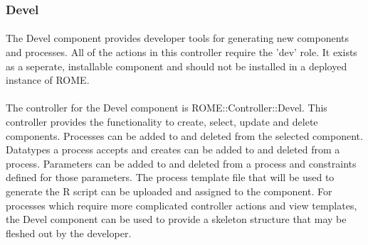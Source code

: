 \subsubsection{Devel}
\label{sec:devel}

\paragraph{}
The Devel component provides developer tools for generating new components and processes. All of the actions in this controller require the 'dev' role. It exists as a seperate, installable component and should not be installed in a deployed instance of ROME.


\paragraph{}
The controller for the Devel component is ROME::Controller::Devel. This controller provides the functionality to create, select, update and delete components. Processes can be added to and deleted from the selected component. Datatypes a process accepts and creates can be added to and deleted from a process. Parameters can be added to and deleted from a process and constraints defined for those parameters. The process template file that will be used to generate the R script can be uploaded and assigned to the component. For processes which require more complicated controller actions and view templates, the Devel component can be used to provide a skeleton structure that may be fleshed out by the developer. 

